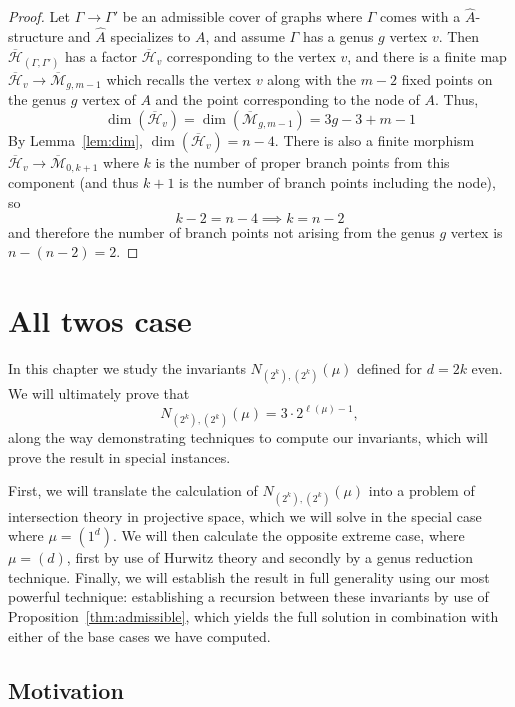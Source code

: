 \documentclass[thesis]{thesis-umich}           %
\newcommand{\mb}{\overline{\mathcal M}}
\newcommand{\Hb}{\overline{\mathcal H}}
\theoremstyle{definition}
\begin{document}
                \begin{proof}
                  Let $\Gamma\to\Gamma'$ be an admissible cover of graphs where $\Gamma$ comes with a $\hat A$-structure and $\hat A$ specializes to $A$, and assume $\Gamma$ has a genus $g$ vertex $v$.
                  Then $\Hb_{(\Gamma,\Gamma')}$ has a factor $\Hb_{v}$ corresponding to the vertex $v$,
                  and there is a finite map $\Hb_{v}\to\mb_{g,m-1}$ which recalls
                  the vertex $v$ along with the $m-2$ fixed points on the genus $g$ vertex of $A$ and
                  the point corresponding to the node of $A$. Thus,
                  \[
                  \dim(\Hb_v)=\dim(\mb_{g,m-1})=3g-3+m-1
                  \]
                  By Lemma~\ref{lem:dim}, $\dim(\Hb_v)=n-4$. There is also a finite morphism
                  $\Hb_v\to\mb_{0,k+1}$ where $k$ is the number of proper branch points from this
                  component (and thus $k+1$ is the number of branch points including the node), so
                  \[
                  k-2=n-4\implies k=n-2
                  \]
                  and therefore the number of branch points not arising from the genus $g$ vertex is $n-(n-2)=2$.
                  \end{proof}


\chapter{All twos case}

In this chapter we study the invariants $N_{(2^k),(2^k)}(\mu)$ defined for $d=2k$ even.
We will ultimately prove that
\[
N_{(2^k),(2^k)}(\mu)=3\cdot 2^{\ell(\mu)-1},
\]
along the way demonstrating techniques to compute our invariants, which will prove the result in special instances.

First, we will translate the calculation of $N_{(2^k),(2^k)}(\mu)$ into a problem of intersection theory
in projective space, which we will solve in the special case where $\mu=(1^d)$.
We will then calculate the opposite extreme case, where $\mu=(d)$, first by use of Hurwitz theory and
secondly by a genus reduction technique. Finally, we will establish the result in full generality using
our most powerful technique: establishing a recursion between these invariants by use of Proposition~\ref{thm:admissible}, which yields the full solution in combination with either of the base
cases we have computed.

\section{Motivation}
\end{document}
